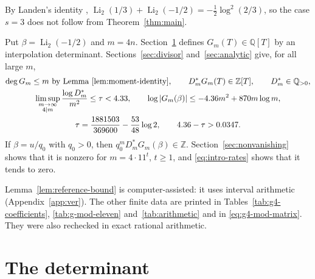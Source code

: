 \documentclass{amsart}
\numberwithin{equation}{section}
\numberwithin{table}{section}
\newcommand{\Li}{\operatorname{Li}}
\newcommand{\Z}{\mathbb{Z}}
\begin{document}
By Landen's identity \cite[(25.12.3)]{DLMF},
$\Li_2(1/3)+\Li_2(-1/2)=-\frac12\log^2(2/3)$, so the case $s=3$ does not
follow from Theorem~\ref{thm:main}.

Put $\beta=\Li_2(-1/2)$ and $m=4n$. Section~\ref{sec:determinant} defines
$G_m(T)\in\mathbb Q[T]$ by an interpolation determinant.
Sections~\ref{sec:divisor} and~\ref{sec:analytic} give, for all large $m$,
\begin{gather}
\deg G_m\le m\ \text{by Lemma~\ref{lem:moment-identity}},\qquad
D_m^*G_m(T)\in\Z[T],
\qquad D_m^*\in\mathbb Q_{>0},\notag
\\
\limsup_{\substack{m\to\infty\\4\mid m}}
  \frac{\log D_m^*}{m^2}\le\tau<4.33,
\qquad
\log|G_m(\beta)|\le-4.36m^2+870m\log m,\label{eq:intro-rates}\\
\tau=\frac{1881503}{369600}-\frac{53}{48}\log2,
\qquad 4.36-\tau>0.0347.\notag
\end{gather}
If $\beta=u/q_0$ with $q_0>0$, then $q_0^mD_m^*G_m(\beta)\in\Z$.
Section~\ref{sec:nonvanishing} shows that it is nonzero for
$m=4\cdot11^t$, $t\ge1$, and \eqref{eq:intro-rates} shows that it tends
to zero.

Lemma~\ref{lem:reference-bound} is computer-assisted: it uses interval
arithmetic (Appendix~\ref{app:ver}). The other finite data are printed in
Tables~\ref{tab:g4-coefficients}, \ref{tab:g-mod-eleven}
and~\ref{tab:arithmetic} and in \eqref{eq:g4-mod-matrix}. They were also
rechecked in exact rational arithmetic.

\section{The determinant}\label{sec:determinant}
\end{document}
